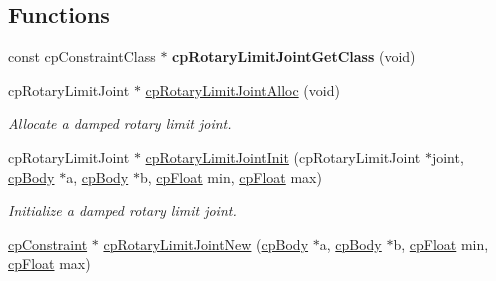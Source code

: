 \subsection*{Functions}
\begin{DoxyCompactItemize}
\item 
\hypertarget{group__cp_rotary_limit_joint_ga580359c4412995333f183a3440d6152d}{const cp\-Constraint\-Class $\ast$ {\bfseries cp\-Rotary\-Limit\-Joint\-Get\-Class} (void)}\label{group__cp_rotary_limit_joint_ga580359c4412995333f183a3440d6152d}

\item 
\hypertarget{group__cp_rotary_limit_joint_ga188c8abeede5f9f878ec7a04e6d9af9b}{cp\-Rotary\-Limit\-Joint $\ast$ \hyperlink{group__cp_rotary_limit_joint_ga188c8abeede5f9f878ec7a04e6d9af9b}{cp\-Rotary\-Limit\-Joint\-Alloc} (void)}\label{group__cp_rotary_limit_joint_ga188c8abeede5f9f878ec7a04e6d9af9b}

\begin{DoxyCompactList}\small\item\em Allocate a damped rotary limit joint. \end{DoxyCompactList}\item 
\hypertarget{group__cp_rotary_limit_joint_ga3f849df8d2439c089147f48646f0a551}{cp\-Rotary\-Limit\-Joint $\ast$ \hyperlink{group__cp_rotary_limit_joint_ga3f849df8d2439c089147f48646f0a551}{cp\-Rotary\-Limit\-Joint\-Init} (cp\-Rotary\-Limit\-Joint $\ast$joint, \hyperlink{structcp_body}{cp\-Body} $\ast$a, \hyperlink{structcp_body}{cp\-Body} $\ast$b, \hyperlink{group__basic_types_gac1ed65573e035bf892505768c852d8d3}{cp\-Float} min, \hyperlink{group__basic_types_gac1ed65573e035bf892505768c852d8d3}{cp\-Float} max)}\label{group__cp_rotary_limit_joint_ga3f849df8d2439c089147f48646f0a551}

\begin{DoxyCompactList}\small\item\em Initialize a damped rotary limit joint. \end{DoxyCompactList}\item 
\hypertarget{group__cp_rotary_limit_joint_gaaa34430075cb2b674d73c66b667a4a36}{\hyperlink{structcp_constraint}{cp\-Constraint} $\ast$ \hyperlink{group__cp_rotary_limit_joint_gaaa34430075cb2b674d73c66b667a4a36}{cp\-Rotary\-Limit\-Joint\-New} (\hyperlink{structcp_body}{cp\-Body} $\ast$a, \hyperlink{structcp_body}{cp\-Body} $\ast$b, \hyperlink{group__basic_types_gac1ed65573e035bf892505768c852d8d3}{cp\-Float} min, \hyperlink{group__basic_types_gac1ed65573e035bf892505768c852d8d3}{cp\-Float} max)}\label{group__cp_rotary_limit_joint_gaaa34430075cb2b674d73c66b667a4a36}


\end{DoxyCompactItemize}
